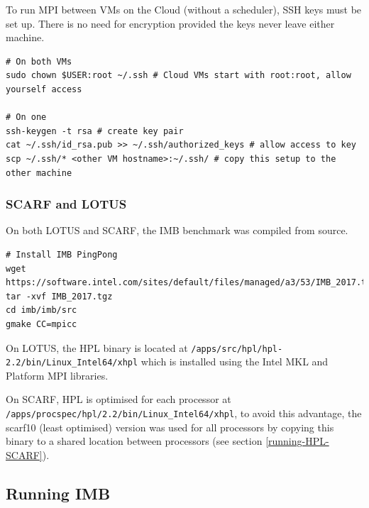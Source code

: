 \documentclass{article}
\newenvironment{code}{\captionsetup{type=listing}}{}
\begin{document}
        To run MPI between VMs on the Cloud (without a scheduler), SSH keys must be set up. There is no need for encryption provided the keys never leave either machine.
            \begin{code}
            \label{code:builds-cloud-setupssh-sh}
            \begin{verbatim}
# On both VMs
sudo chown $USER:root ~/.ssh # Cloud VMs start with root:root, allow yourself access

# On one
ssh-keygen -t rsa # create key pair
cat ~/.ssh/id_rsa.pub >> ~/.ssh/authorized_keys # allow access to key
scp ~/.ssh/* <other VM hostname>:~/.ssh/ # copy this setup to the other machine
            \end{verbatim}
            \end{code}

        \subsubsection{SCARF and LOTUS}
        On both LOTUS and SCARF, the IMB benchmark was compiled from source.

            \begin{code}
            \label{code:builds-jasmin_scarf-buildimb-sh}
            \begin{verbatim}
# Install IMB PingPong
wget https://software.intel.com/sites/default/files/managed/a3/53/IMB_2017.tgz
tar -xvf IMB_2017.tgz
cd imb/imb/src
gmake CC=mpicc
            \end{verbatim}
            \end{code}


        On LOTUS, the HPL binary is located at \verb|/apps/src/hpl/hpl-2.2/bin/Linux_Intel64/xhpl| which is installed using the Intel MKL and Platform MPI libraries.

        On SCARF, HPL is optimised for each processor at \verb|/apps/procspec/hpl/2.2/bin/Linux_Intel64/xhpl|, to avoid this advantage, the scarf10 (least optimised) version was used for all processors by copying this binary to a shared location between processors (see section \ref{running-HPL-SCARF}).




    \subsection{Running IMB}
\end{document}
